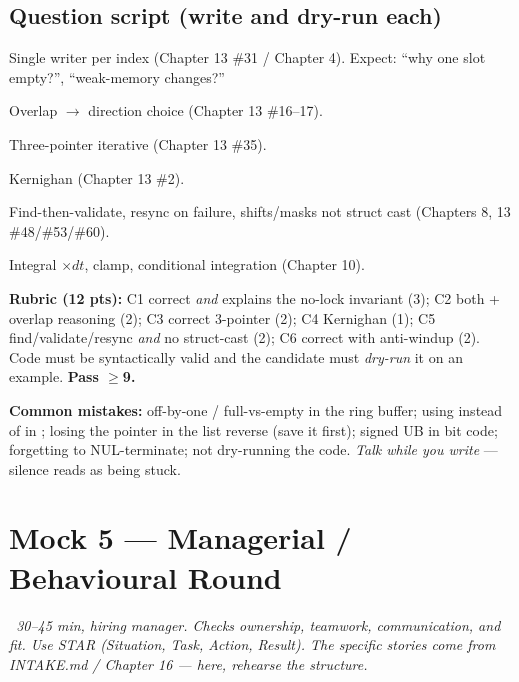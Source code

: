 \subsection*{Question script (write and dry-run each)}
Single writer per index (Chapter 13 \#31 / Chapter 4). Expect: ``why one slot
empty?'', ``weak-memory changes?''

Overlap $\rightarrow$ direction choice (Chapter 13 \#16--17).

Three-pointer iterative (Chapter 13 \#35).

Kernighan  (Chapter 13 \#2).

Find-then-validate, resync on failure, shifts/masks not struct cast
(Chapters 8, 13 \#48/\#53/\#60).

Integral $\times dt$, clamp, conditional integration (Chapter 10).

\begin{scorecard}
\textbf{Rubric (12 pts):} C1 correct \emph{and} explains the no-lock invariant
(3); C2 both + overlap reasoning (2); C3 correct 3-pointer (2); C4 Kernighan
(1); C5 find/validate/resync \emph{and} no struct-cast (2); C6 correct with
anti-windup (2). Code must be syntactically valid and the candidate must
\emph{dry-run} it on an example. \textbf{Pass $\ge$9.}
\end{scorecard}

\textbf{Common mistakes:} off-by-one / full-vs-empty in the ring buffer; using
 instead of  in ; losing the
 pointer in the list reverse (save it first);  signed UB
in bit code; forgetting to NUL-terminate; not dry-running the code. \emph{Talk
while you write} --- silence reads as being stuck.

\section{Mock 5 --- Managerial / Behavioural Round}
\emph{~30--45 min, hiring manager. Checks ownership, teamwork, communication,
and fit. Use STAR (Situation, Task, Action, Result). The specific stories come
from INTAKE.md / Chapter 16 --- here, rehearse the structure.}

